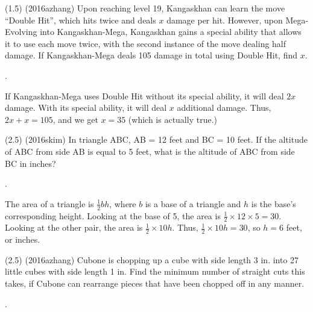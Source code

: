 \documentclass[11pt]{article}
\begin{document}
\begin{problem}
(1.5) (2016azhang) Upon reaching level 19, Kangaskhan can learn the move ``Double Hit'', which hits twice and deals $x$ damage per hit. However, upon Mega-Evolving into Kangaskhan-Mega, Kangaskhan gains a special ability that allows it to use each move twice, with the second instance of the move dealing half damage. If Kangaskhan-Mega deals 105 damage in total using Double Hit, find $x$.
\end{problem}

\begin{answer}
.
\end{answer}

\begin{solution}
If Kangaskhan-Mega uses Double Hit without its special ability, it will deal $2x$ damage. With its special ability, it will deal $x$ additional damage. Thus, $2x + x = 105$, and we get $x = \boxed{35}$ (which is actually true.)
\end{solution}

\begin{problem}
(2.5) (2016skim) In triangle ABC, AB = 12 feet and BC = 10 feet. If the altitude of ABC from side AB is equal to 5 feet, what is the altitude of ABC from side BC in inches?
\end{problem}

\begin{answer}
.
\end{answer}

\begin{solution}
The area of a triangle is $\frac{1}{2}bh$, where $b$ is a base of a triangle and $h$ is the base's corresponding height. Looking at the base of 5, the area is $\frac{1}{2} \times 12 \times 5 = 30$. Looking at the other pair, the area is $\frac{1}{2} \times 10h$. Thus, $\frac{1}{2} \times 10 h = 30$, so $h = 6$ feet, or  inches.
\end{solution}

\begin{problem}
(2.5) (2016azhang) Cubone is chopping up a cube with side length 3 in. into 27 little cubes with side length 1 in. Find the minimum number of straight cuts this takes, if Cubone can rearrange pieces that have been chopped off in any manner.
\end{problem}

\begin{answer}
.
\end{answer}
\end{document}
